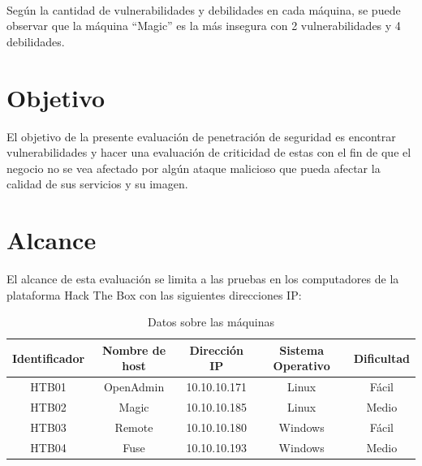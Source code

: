 \documentclass[a4paper]{article}
\begin{document}
\\
\large{Según la cantidad de vulnerabilidades y debilidades en cada máquina, se puede observar que la máquina “Magic” es la más insegura con 2 vulnerabilidades y 4 debilidades.}

\clearpage
\section{Objetivo}
\large{El objetivo de la presente evaluación de penetración de seguridad es encontrar vulnerabilidades y hacer una evaluación de criticidad de estas con el fin de que el negocio no se vea afectado por algún ataque malicioso que pueda afectar la calidad de sus servicios y su imagen.}
\section{Alcance}
\large{El alcance de esta evaluación se limita a las pruebas en los computadores de la plataforma Hack The Box con las siguientes direcciones IP:}
\par
\begin{table}[h]
    \centering
    \begin{tabular}{|c|c|c|c|c|} \hline
        Identificador & Nombre de host & Dirección IP & Sistema Operativo & Dificultad \\ \hline
        HTB01 & OpenAdmin & 10.10.10.171 & Linux & Fácil \\ \hline
        HTB02 & Magic & 10.10.10.185 & Linux & Medio \\ \hline
        HTB03 & Remote & 10.10.10.180 & Windows & Fácil \\ \hline
        HTB04 & Fuse & 10.10.10.193 & Windows & Medio \\ \hline
    \end{tabular}
    \caption{Datos sobre las máquinas}
\end{table}
\end{document}
